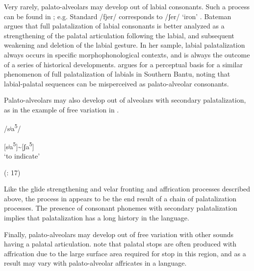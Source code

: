   Very rarely, palato-alveolars may develop out of labial consonants. Such a process can be found in ; e.g. Standard  /fjer/ corresponds to  /ʃer/ ‘iron’ \citep[108]{Bateman2007}. Bateman argues that full palatalization of labial consonants is better analyzed as a strengthening of the palatal articulation following the labial, and subsequent weakening and deletion of the labial gesture. In her sample, labial palatalization always occurs in specific morphophonological contexts, and is always the outcome of a series of historical developments. \citet{Ohala1978} argues for a perceptual basis for a similar phenomenon of full palatalization of labials in Southern Bantu, noting that labial-palatal sequences can be misperceived as palato-alveolar consonants.

  Palato-alveolars may also develop out of alveolars with secondary palatalization, as in the example of free variation in  .

\ea\label{ex:4.38}

/sʲa\textsuperscript{5}/

[sʲa\textsuperscript{5}]{\textasciitilde}[ʃa\textsuperscript{5}]\\
\glt ‘to indicate’

(\citealt{BearthZemp1967}: 17)
\z

Like the glide strengthening and velar fronting and affrication processes described above, the process in  appears to be the end result of a chain of palatalization processes. The presence of consonant phonemes with secondary palatalization implies that palatalization has a long history in the language.

  Finally, palato-alveolars may develop out of free variation with other sounds having a palatal articulation. \citet[31--33]{LadefogedMaddieson1996} note that palatal stops are often produced with affrication due to the large surface area required for stop in this region, and as a result may vary with palato-alveolar affricates in a language.

